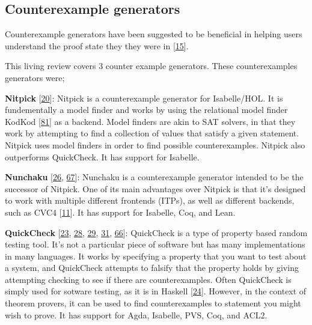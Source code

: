 \documentclass[
]{article}
\begin{document}
\hypertarget{sec:counterexamples}{%
\subsection{Counterexample generators}\label{sec:counterexamples}}

Counterexample generators have been suggested to be beneficial in
helping users understand the proof state they they were in
{[}\protect\hyperlink{ref-beckert_usability_2015}{15}{]}.

This living review covers 3 counter example generators. These
counterexamples generators were;

\textbf{Nitpick} {[}\protect\hyperlink{ref-Nitpick}{20}{]}: Nitpick is a
counterexample generator for Isabelle/HOL. It is fundementally a model
finder and works by using the relational model finder KodKod
{[}\protect\hyperlink{ref-KodKod}{81}{]} as a backend. Model finders are
akin to SAT solvers, in that they work by attempting to find a
collection of values that satisfy a given statement. Nitpick uses model
finders in order to find possible counterexamples. Nitpick also
outperforms QuickCheck. It has support for Isabelle.

\textbf{Nunchaku} {[}\protect\hyperlink{ref-NanchakuCoq}{26},
\protect\hyperlink{ref-NanchakuLean}{67}{]}: Nunchaku is a
counterexample generator intended to be the successor of Nitpick. One of
its main advantages over Nitpick is that it's designed to work with
multiple different frontends (ITPs), as well as different backends, such
as CVC4 {[}\protect\hyperlink{ref-CVC4}{11}{]}. It has support for
Isabelle, Coq, and Lean.

\textbf{QuickCheck} {[}\protect\hyperlink{ref-QuickCheckIsabelle}{23},
\protect\hyperlink{ref-QuickChick}{28},
\protect\hyperlink{ref-QuickCheckAgda}{29},
\protect\hyperlink{ref-DoubleCheck}{31},
\protect\hyperlink{ref-PVSQuickCheck}{66}{]}: QuickCheck is a type of
property based random testing tool. It's not a particular piece of
software but has many implementations in many languages. It works by
specifying a property that you want to test about a system, and
QuickCheck attempts to falsify that the property holds by giving
attempting checking to see if there are counterexamples. Often
QuickCheck is simply used for sotware testing, as it is in Haskell
{[}\protect\hyperlink{ref-QuickCheckHaskell}{24}{]}. However, in the
context of theorem provers, it can be used to find counterexamples to
statement you might wish to prove. It has support for Agda, Isabelle,
PVS, Coq, and ACL2.
\end{document}
